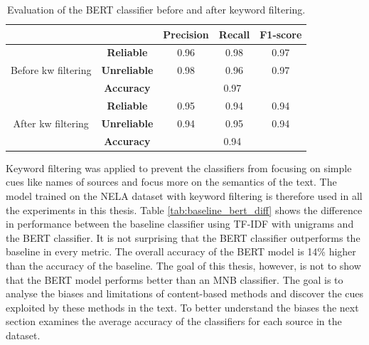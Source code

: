 \begin{table}[H]
    \centering
\begin{tabular}{cc|c|c|c|}
\cline{3-5}
                                        &                     & \textbf{Precision} & \textbf{Recall} & \textbf{F1-score} \\ \hline
\multicolumn{1}{|c|}{\multirow{3}{*}{Before kw filtering}} & \textbf{Reliable}   & 0.96               & 0.98            & 0.97              \\ \cline{2-5} 
\multicolumn{1}{|c|}{}                  & \textbf{Unreliable} & 0.98               & 0.96            & 0.97              \\ \cline{2-5} 
\multicolumn{1}{|c|}{}                  & \textbf{Accuracy}   & \multicolumn{3}{c|}{0.97}                                \\ \hline \hline
\multicolumn{1}{|c|}{\multirow{3}{*}{After kw filtering}} & \textbf{Reliable}   & 0.95               & 0.94            & 0.94              \\ \cline{2-5} 
\multicolumn{1}{|c|}{}                  & \textbf{Unreliable} & 0.94               & 0.95            & 0.94              \\ \cline{2-5} 
\multicolumn{1}{|c|}{}                  & \textbf{Accuracy}   & \multicolumn{3}{c|}{0.94}                                \\ \hline
\end{tabular}
    \caption{Evaluation of the BERT classifier before and after keyword filtering.}
    \label{tab:bert_eval1}
\end{table}

Keyword filtering was applied to prevent the classifiers from focusing on simple cues like names of sources and focus more on the semantics of the text. The model trained on the NELA dataset with keyword filtering is therefore used in all the experiments in this thesis. 
Table \ref{tab:baseline_bert_diff} shows the difference in performance between the baseline classifier using TF-IDF with unigrams and the BERT classifier. It is not surprising that the BERT classifier outperforms the baseline in every metric. The overall accuracy of the BERT model is 14\% higher than the accuracy of the baseline. The goal of this thesis, however, is not to show that the BERT model performs better than an MNB classifier. The goal is to analyse the biases and limitations of content-based methods and discover the cues exploited by these methods in the text. To better understand the biases the next section examines the average accuracy of the classifiers for each source in the dataset.

